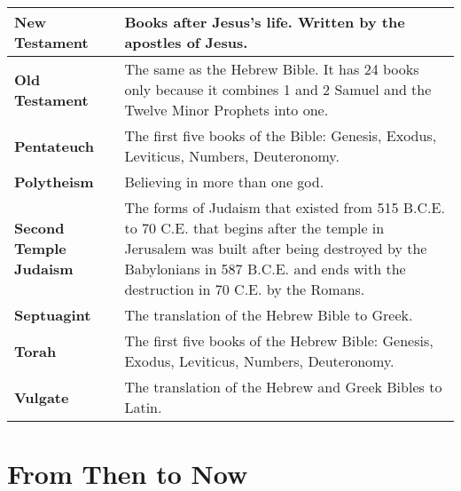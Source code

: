 \documentclass{report}
\begin{document}
\begin{center}
\begin{longtable}{| p{5cm} | p{7cm} |}
            \textbf{New Testament} & Books after Jesus's life. Written by the apostles of Jesus.\\ \hline
            \textbf{Old Testament} & The same as the Hebrew Bible. It has 24 books only because it combines 1 and 2 Samuel and the Twelve Minor Prophets into one.\\ \hline
            \textbf{Pentateuch} & The first five books of the Bible: Genesis, Exodus, Leviticus, Numbers, Deuteronomy.\\ \hline
            \textbf{Polytheism} & Believing in more than one god.\\ \hline
            \textbf{Second Temple Judaism} & The forms of Judaism that existed from 515 B.C.E. to 70 C.E. that begins after the temple in Jerusalem was built after being destroyed by the Babylonians in 587 B.C.E. and ends with the destruction in 70 C.E. by the Romans.\\ \hline
            \textbf{Septuagint} & The translation of the Hebrew Bible to Greek.\\ \hline
            \textbf{Torah} & The first five books of the Hebrew Bible: Genesis, Exodus, Leviticus, Numbers, Deuteronomy.\\ \hline
            \textbf{Vulgate} & The translation of the Hebrew and Greek Bibles to Latin.\\ \hline
        \end{longtable}
        \end{center}
    \chapter{From Then to Now}
\end{document}
